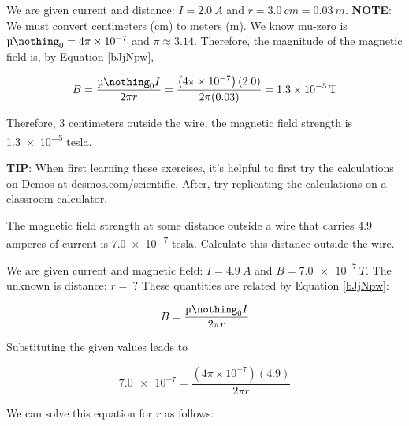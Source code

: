 \documentclass[main.tex]{subfiles}
\begin{document}
We are given current and distance: $I=\SI{2.0}{A}$ and $r = \SI{3.0}{cm} = \SI{0.03}{m}$. \textbf{NOTE}: We must convert centimeters (cm) to meters (m). We know mu-zero is $\mymu_0 = 4\pi \times 10^{-7}$ and $\pi \approx 3.14$. Therefore, the magnitude of the magnetic field is, by Equation \ref{bJjNpw},

\begin{equation*}
    B=\frac{\mymu_0 I}{2\pi r} = \frac{\left(4\pi \times 10^{-7}\right)(2.0)}{2 \pi (0.03)} = \SI{1.3e-5}{T}
\end{equation*}

Therefore, 3 centimeters outside the wire, the magnetic field strength is \num{1.3e-5} tesla.

\vspace{1em}

\cyanhrule


\begin{mdframed}[backgroundcolor=black!10]
    \textbf{TIP}: When first learning these exercises, it's helpful to first try the calculations on Demos at \href{https://www.desmos.com/scientific}{desmos.com/scientific}. After, try replicating the calculations on a classroom calculator.
\end{mdframed}

\begin{example}
The magnetic field strength at some distance outside a wire that carries 4.9 amperes of current is \num{7.0e-7} tesla. Calculate this distance outside the wire.
\end{example}

\Solution We are given current and magnetic field: $I = \SI{4.9}{A}$ and $B = \SI{7.0e-7}{T}$. The unknown is distance: $r =\ ?$ These quantities are related by Equation \ref{bJjNpw}:

\begin{equation*}
    B = \frac{\mymu_0 I}{2\pi r}
\end{equation*}

Substituting the given values leads to 

\begin{equation*}
    \num{7.0e-7} = \frac{\left(4\pi \times 10^{-7}\right) (4.9)}{2\pi r}
\end{equation*}

We can solve this equation for $r$ as follows:
\end{document}
